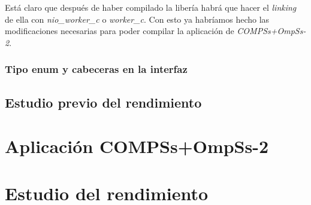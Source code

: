 Está claro que después de haber compilado la libería habrá que hacer el \textit{linking} de ella con \textit{nio\_worker\_c} o \textit{worker\_c}. Con esto ya habríamos hecho las modificaciones necesarias para poder compilar la aplicación de \textit{COMPSs+OmpSs-2}.

\subsubsection{Tipo enum y cabeceras en la interfaz}


\subsection{Estudio previo del rendimiento}
\section{Aplicación COMPSs+OmpSs-2}
\section{Estudio del rendimiento}

